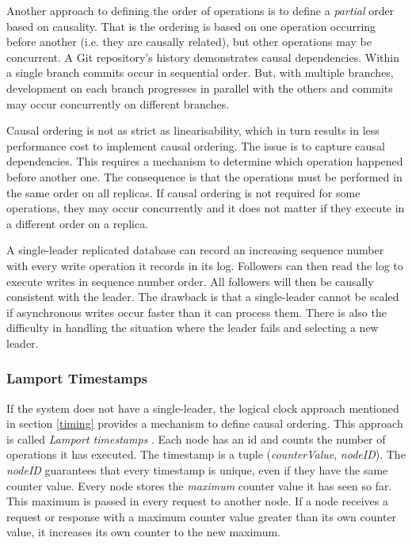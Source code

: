 Another approach to defining the order of operations is to define a \emph{partial} order based on causality.
That is the ordering is based on one operation occurring before another (i.e. they are causally related),
but other operations may be concurrent.
A Git repository's history demonstrates causal dependencies.
Within a single branch commits occur in sequential order.
But, with multiple branches, development on each branch progresses in parallel with the others
and commits may occur concurrently on different branches.

Causal ordering is not as strict as linearisability, which in turn results in less performance cost to implement causal ordering.
The issue is to capture causal dependencies.
This requires a mechanism to determine which operation happened before another one.
The consequence is that the operations must be performed in the same order on all replicas.
If causal ordering is not required for some operations, they may occur concurrently
and it does not matter if they execute in a different order on a replica.

A single-leader replicated database can record an increasing sequence number with every write operation it records in its log.
Followers can then read the log to execute writes in sequence number order.
All followers will then be causally consistent with the leader.
The drawback is that a single-leader cannot be scaled if asynchronous writes occur faster than it can process them.
There is also the difficulty in handling the situation where the leader fails and selecting a new leader.

\subsubsection{Lamport Timestamps}
If the system does not have a single-leader, the logical clock approach mentioned in section \ref{timing} provides a mechanism to define causal ordering.
This approach is called \emph{Lamport timestamps} \cite{LamportLeslie1978Tcat}.
Each node has an id and counts the number of operations it has executed.
The timestamp is a tuple (\emph{counterValue}, \emph{nodeID}).
The \emph{nodeID} guarantees that every timestamp is unique, even if they have the same counter value.
Every node stores the \emph{maximum} counter value it has seen so far.
This maximum is passed in every request to another node.
If a node receives a request or response with a maximum counter value greater than its own counter value,
it increases its own counter to the new maximum.

